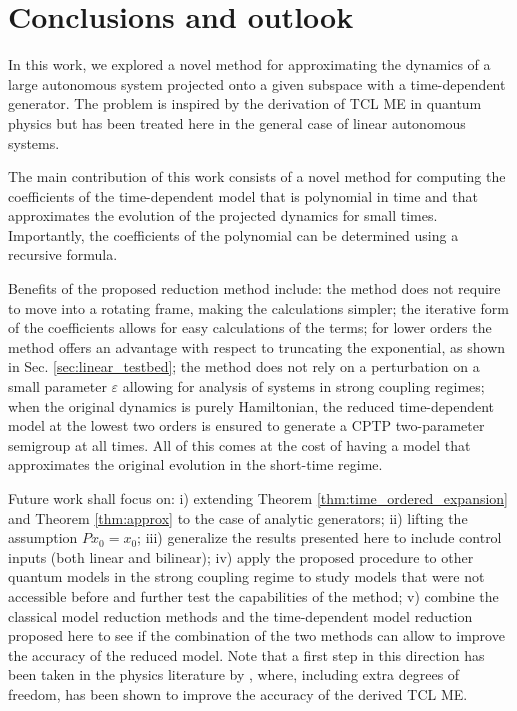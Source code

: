 \documentclass[twocolumn]{autart}    %
\begin{document}
\section{Conclusions and outlook}
\label{sec:conclusion}

In this work, we explored a novel method for approximating the dynamics of a large autonomous system projected onto a given subspace with a time-dependent generator. The problem is inspired by the derivation of TCL ME in quantum physics but has been treated here in the general case of linear autonomous systems. 

The main contribution of this work consists of a novel method for computing the coefficients of the time-dependent model that is polynomial in time and that approximates the evolution of the projected dynamics for small times. Importantly, the coefficients of the polynomial can be determined using a recursive formula.  

Benefits of the proposed reduction method include: the method does not require to move into a rotating frame, making the calculations simpler; the iterative form of the coefficients allows for easy calculations of the terms; for lower orders the method offers an advantage with respect to truncating the exponential, as shown in Sec. \ref{sec:linear_testbed}; the method does not rely on a perturbation on a small parameter $\varepsilon$ allowing for analysis of systems in strong coupling regimes; when the original dynamics is purely Hamiltonian, the reduced time-dependent model at the lowest two orders is ensured to generate a CPTP two-parameter semigroup at all times. All of this comes at the cost of having a model that approximates the original evolution in the short-time regime. 

Future work shall focus on: 
i) extending Theorem \ref{thm:time_ordered_expansion} and Theorem \ref{thm:approx} to the case of analytic generators; 
ii) lifting the assumption $Px_0 =x_0$; 
iii) generalize the results presented here to include control inputs (both linear and bilinear);
iv) apply the proposed procedure to other quantum models in the strong coupling regime to study models that were not accessible before and further test the capabilities of the method; 
v) combine the classical model reduction methods and the time-dependent model reduction proposed here to see if the combination of the two methods can allow to improve the accuracy of the reduced model. Note that a first step in this direction has been taken in the physics literature by \cite{breuer2006,breuer2007}, where, including extra degrees of freedom, has been shown to improve the accuracy of the derived TCL ME.
\end{document}
